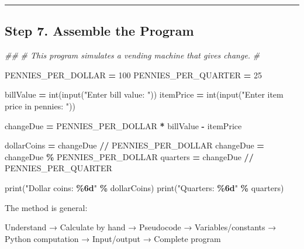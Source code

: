 \documentclass[
]{article}
\newenvironment{Shaded}{\begin{snugshade}}{\end{snugshade}}
\newcommand{\BuiltInTok}[1]{#1}
\newcommand{\CommentTok}[1]{\textcolor[rgb]{0.56,0.35,0.01}{\textit{#1}}}
\newcommand{\DecValTok}[1]{\textcolor[rgb]{0.00,0.00,0.81}{#1}}
\newcommand{\NormalTok}[1]{#1}
\newcommand{\OperatorTok}[1]{\textcolor[rgb]{0.81,0.36,0.00}{\textbf{#1}}}
\newcommand{\SpecialCharTok}[1]{\textcolor[rgb]{0.81,0.36,0.00}{\textbf{#1}}}
\newcommand{\StringTok}[1]{\textcolor[rgb]{0.31,0.60,0.02}{#1}}
\begin{document}
\begin{center}\rule{0.5\linewidth}{0.5pt}\end{center}

\subsection{Step 7. Assemble the
Program}\label{step-7.-assemble-the-program}

\begin{Shaded}
\begin{Highlighting}[]
\CommentTok{\#\#}
\CommentTok{\# This program simulates a vending machine that gives change.}
\CommentTok{\#}

\NormalTok{PENNIES\_PER\_DOLLAR }\OperatorTok{=} \DecValTok{100}
\NormalTok{PENNIES\_PER\_QUARTER }\OperatorTok{=} \DecValTok{25}

\NormalTok{billValue }\OperatorTok{=} \BuiltInTok{int}\NormalTok{(}\BuiltInTok{input}\NormalTok{(}\StringTok{"Enter bill value: "}\NormalTok{))}
\NormalTok{itemPrice }\OperatorTok{=} \BuiltInTok{int}\NormalTok{(}\BuiltInTok{input}\NormalTok{(}\StringTok{"Enter item price in pennies: "}\NormalTok{))}

\NormalTok{changeDue }\OperatorTok{=}\NormalTok{ PENNIES\_PER\_DOLLAR }\OperatorTok{*}\NormalTok{ billValue }\OperatorTok{{-}}\NormalTok{ itemPrice}

\NormalTok{dollarCoins }\OperatorTok{=}\NormalTok{ changeDue }\OperatorTok{//}\NormalTok{ PENNIES\_PER\_DOLLAR}
\NormalTok{changeDue }\OperatorTok{=}\NormalTok{ changeDue }\OperatorTok{\%}\NormalTok{ PENNIES\_PER\_DOLLAR}
\NormalTok{quarters }\OperatorTok{=}\NormalTok{ changeDue }\OperatorTok{//}\NormalTok{ PENNIES\_PER\_QUARTER}

\BuiltInTok{print}\NormalTok{(}\StringTok{"Dollar coins: }\SpecialCharTok{\%6d}\StringTok{"} \OperatorTok{\%}\NormalTok{ dollarCoins)}
\BuiltInTok{print}\NormalTok{(}\StringTok{"Quarters:     }\SpecialCharTok{\%6d}\StringTok{"} \OperatorTok{\%}\NormalTok{ quarters)}
\end{Highlighting}
\end{Shaded}

The method is general:

\begin{Shaded}
\begin{Highlighting}[]
\NormalTok{Understand}
\NormalTok{→ Calculate by hand}
\NormalTok{→ Pseudocode}
\NormalTok{→ Variables/constants}
\NormalTok{→ Python computation}
\NormalTok{→ Input/output}
\NormalTok{→ Complete program}
\end{Highlighting}
\end{Shaded}
\end{document}
